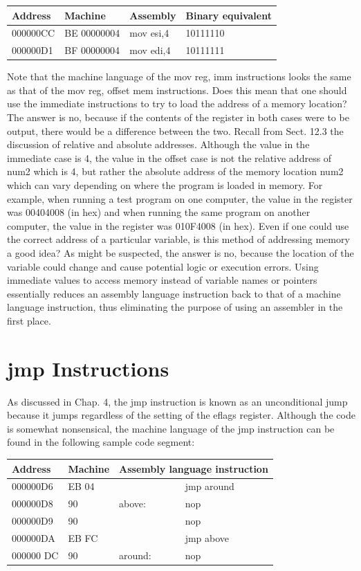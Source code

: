 \documentclass[10pt]{book}
\begin{document}
\begin{center}
\begin{tabular}{|l|l|l|l|}
\hline
Address & Machine & Assembly & Binary equivalent \\
\hline
000000CC & BE 00000004 & mov esi,4 & 10111110 \\
\hline
000000D1 & BF 00000004 & mov edi,4 & 10111111 \\
\hline
\end{tabular}
\end{center}

Note that the machine language of the mov reg, imm instructions looks the same as that of the mov reg, offset mem instructions. Does this mean that one should use the immediate instructions to try to load the address of a memory location? The answer is no, because if the contents of the register in both cases were to be output, there would be a difference between the two. Recall from Sect. 12.3 the discussion of relative and absolute addresses. Although the value in the immediate case is 4, the value in the offset case is not the relative address of num2 which is 4, but rather the absolute address of the memory location num2 which can vary depending on where the program is loaded in memory. For example, when running a test program on one computer, the value in the register was 00404008 (in hex) and when running the same program on another computer, the value in the register was 010F4008 (in hex).
Even if one could use the correct address of a particular variable, is this method of addressing memory a good idea? As might be suspected, the answer is no, because the location of the variable could change and cause potential logic or execution errors. Using immediate values to access memory instead of variable names or pointers essentially reduces an assembly language instruction back to that of a machine language instruction, thus eliminating the purpose of using an assembler in the first place.

\section{jmp Instructions}
As discussed in Chap. 4, the jmp instruction is known as an unconditional jump because it jumps regardless of the setting of the eflags register. Although the code is somewhat nonsensical, the machine language of the jmp instruction can be found in the following sample code segment:

\begin{center}
\begin{tabular}{|l|l|l|l|}
\hline
Address & Machine & \multicolumn{2}{c|}{Assembly language instruction} \\
\hline
000000D6 & EB 04 &  & jmp around \\
\hline
000000D8 & 90 & above: & nop \\
\hline
000000D9 & 90 &  & nop \\
\hline
000000DA & EB FC &  & jmp above \\
\hline
000000 DC & 90 & around: & nop \\
\hline
\end{tabular}
\end{center}
\end{document}
